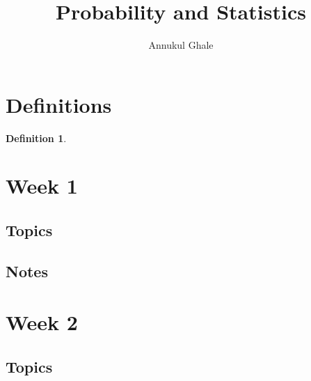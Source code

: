 \documentclass[12pt]{article}
\newtheorem{definition}{Definition}
\begin{document}
\title{\textbf{Probability and Statistics}}
\author{Annukul Ghale}


\maketitle

\tableofcontents
\newpage



\section{Definitions}


\begin{definition}
\end{definition}



\section{Week 1}

\subsection{Topics}



\subsection{Notes}






\section{Week 2}

\subsection{Topics}
\end{document}
